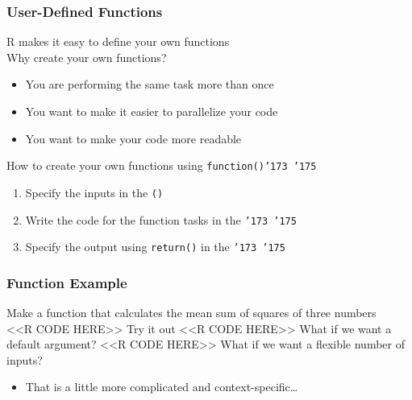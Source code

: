 \documentclass{beamer}
\begin{document}
\begin{frame}\frametitle{User-Defined Functions}
    R makes it easy to define your own functions \\
    \vspace{2ex}
    Why create your own functions?
    \begin{itemize}
        \item You are performing the same task more than once
        \item You want to make it easier to parallelize your code
        \item You want to make your code more readable
    \end{itemize}
    \vspace{2ex}
    How to create your own functions using \texttt{function()\char '173 \char '175}
    \begin{enumerate}
        \item Specify the inputs in the \texttt{()}
        \item Write the code for the function tasks in the \texttt{\char '173 \char '175}
        \item Specify the output using \texttt{return()} in the \texttt{\char '173 \char '175}
    \end{enumerate}
\end{frame}

\begin{frame}[fragile]\frametitle{Function Example}
    Make a function that calculates the mean sum of squares of three numbers \\
    <<R CODE HERE>>
    \vspace{1ex}
    Try it out
    <<R CODE HERE>>
    \vspace{1ex}
    What if we want a default argument?
    <<R CODE HERE>>
    \vspace{1ex}
    What if we want a flexible number of inputs?
    \begin{itemize}
        \item That is a little more complicated and context-specific\ldots
    \end{itemize}
\end{frame}
\end{document}
